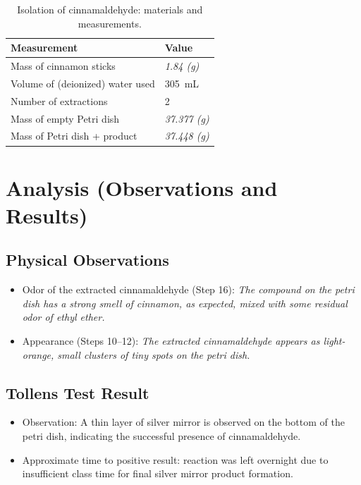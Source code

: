 \documentclass[
  10pt,
  twocolumn,
  letterpaper,
]{article}
\begin{document}
\begin{table}[H]
  \centering
  \caption{Isolation of cinnamaldehyde: materials and measurements.}
  \label{tab:data}
  \begin{tabular}{@{}p{}p{}@{}}
    \toprule
    \textbf{Measurement} & \textbf{Value} \\
    \midrule
    Mass of cinnamon sticks & \textit{1.84 (g)} \\
    Volume of (deionized) water used & \SI{305}{\milli\liter} \\
    Number of extractions & 2 \\
    Mass of empty Petri dish & \textit{37.377 (g)} \\
    Mass of Petri dish + product & \textit{37.448 (g)} \\
    \bottomrule
  \end{tabular}
\end{table}

\section{Analysis (Observations and Results)}

\subsection{Physical Observations}

\begin{itemize}
  \item Odor of the extracted cinnamaldehyde (Step 16): \textit{The compound on the petri dish has a strong smell of cinnamon, as expected, mixed with some residual odor of ethyl ether.}
  \item Appearance (Steps 10--12): \textit{The extracted cinnamaldehyde appears as light-orange, small clusters of tiny spots on the petri dish.}
\end{itemize}

\subsection{Tollens Test Result}

\begin{itemize}
  \item Observation: A thin layer of silver mirror is observed on the bottom of the petri dish, indicating the successful presence of cinnamaldehyde.
  \item Approximate time to positive result: reaction was left overnight due to insufficient class time for final silver mirror product formation.
\end{itemize}
\end{document}
